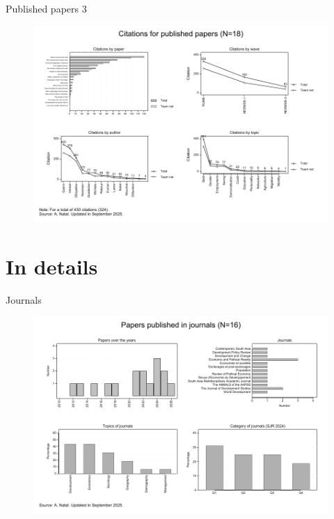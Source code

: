 \documentclass[aspectratio=169]{beamer}
\begin{document}
\begin{frame}{Published papers 3}

\begin{figure}[h]
\centering
\includegraphics[width=0.7\columnwidth]{INPUT/PP_citations}
\end{figure}

\end{frame}








\section*{In details}
\begin{frame}
\label{details}


\end{frame}





\begin{frame}{Journals}

\begin{figure}[h]
\centering
\includegraphics[width=0.7\columnwidth]{INPUT/J_global}
\end{figure}

\end{frame}
\end{document}
